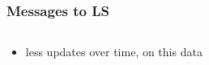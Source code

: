 \begin{frame}[red] %
\frametitle{Messages to LS}
\begin{columns}
\begin{column}{0.5\textwidth}
\begin{itemize}
	\item less updates over time, on this data
	\end{itemize}
\vspace{5cm}
\end{column}
\begin{column}{0.5\textwidth}
\end{column}
\end{columns}
\end{frame}






